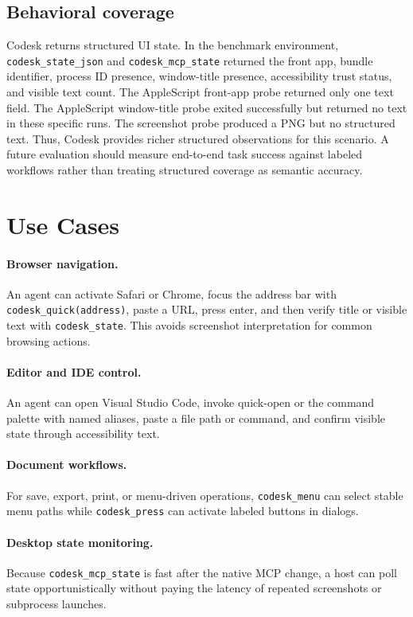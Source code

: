\documentclass[11pt]{article}
\begin{document}
\subsection{Behavioral coverage}

Codesk returns structured UI state. In the benchmark environment, \texttt{codesk\_state\_json} and \texttt{codesk\_mcp\_state} returned the front app, bundle identifier, process ID presence, window-title presence, accessibility trust status, and visible text count. The AppleScript front-app probe returned only one text field. The AppleScript window-title probe exited successfully but returned no text in these specific runs. The screenshot probe produced a PNG but no structured text. Thus, Codesk provides richer structured observations for this scenario. A future evaluation should measure end-to-end task success against labeled workflows rather than treating structured coverage as semantic accuracy.

\section{Use Cases}

\paragraph{Browser navigation.}
An agent can activate Safari or Chrome, focus the address bar with \texttt{codesk\_quick(address)}, paste a URL, press enter, and then verify title or visible text with \texttt{codesk\_state}. This avoids screenshot interpretation for common browsing actions.

\paragraph{Editor and IDE control.}
An agent can open Visual Studio Code, invoke quick-open or the command palette with named aliases, paste a file path or command, and confirm visible state through accessibility text.

\paragraph{Document workflows.}
For save, export, print, or menu-driven operations, \texttt{codesk\_menu} can select stable menu paths while \texttt{codesk\_press} can activate labeled buttons in dialogs.

\paragraph{Desktop state monitoring.}
Because \texttt{codesk\_mcp\_state} is fast after the native MCP change, a host can poll state opportunistically without paying the latency of repeated screenshots or subprocess launches.
\end{document}
